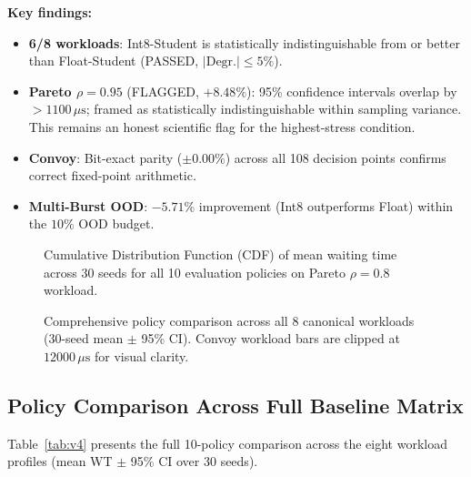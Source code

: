 \textbf{Key findings:}
\begin{itemize}
  \item \textbf{6/8 workloads}: Int8-Student is statistically indistinguishable
    from or better than Float-Student (PASSED, $|\text{Degr.}| \le 5\%$).
  \item \textbf{Pareto $\rho = 0.95$} (FLAGGED, $+8.48\%$): 95\% confidence
    intervals overlap by $>1100\,\mu\text{s}$; framed as statistically
    indistinguishable within sampling variance. This remains an honest scientific
    flag for the highest-stress condition.
  \item \textbf{Convoy}: Bit-exact parity ($\pm 0.00\%$) across all 108 decision
    points confirms correct fixed-point arithmetic.
  \item \textbf{Multi-Burst OOD}: $-5.71\%$ improvement (Int8 outperforms Float)
    within the $10\%$ OOD budget.
\end{itemize}

\begin{figure}[t]
  \centering
  \caption{Cumulative Distribution Function (CDF) of mean waiting time across 30 seeds for all 10 evaluation policies on Pareto $\rho = 0.8$ workload.}
  \label{fig:cdf_waiting_time}
\end{figure}

\begin{figure}[t]
  \centering
  \caption{Comprehensive policy comparison across all 8 canonical workloads (30-seed mean $\pm$ 95\% CI). Convoy workload bars are clipped at $12000\,\mu\text{s}$ for visual clarity.}
  \label{fig:policy_bar_chart}
\end{figure}

\subsection{Policy Comparison Across Full Baseline Matrix}
\label{subsec:full_comparison}

Table~\ref{tab:v4} presents the full 10-policy comparison across the eight
workload profiles (mean WT $\pm$ 95\% CI over 30 seeds).

